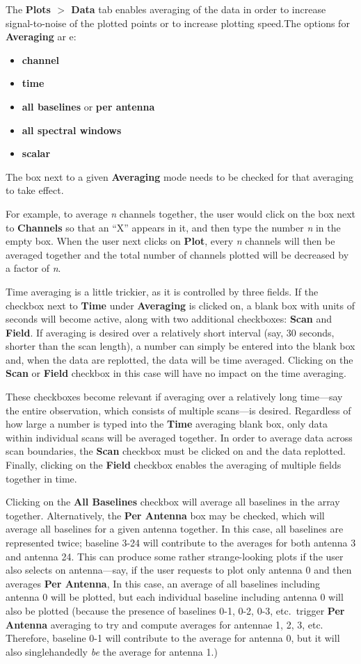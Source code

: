 The {\bf Plots $>$ Data} tab enables averaging of the data in order to increase signal-to-noise of the plotted points or to increase plotting speed.The options for {\bf Averaging} ar e: 
\begin{itemize}
   \item {\bf channel}
   \item {\bf time}
   \item {\bf all baselines} or {\bf per antenna}
   \item {\bf all spectral windows}
   \item {\bf scalar}
\end{itemize}
The box next to a given {\bf Averaging} mode needs to be checked for
that averaging to take effect.

For example, to average {\it n} channels together, the user would
click on the box next to {\bf Channels} so that an ``X'' appears in
it, and then type the number {\it n} in the empty box. When the user
next clicks on {\bf Plot}, every {\it n} channels will then be
averaged together and the total number of channels plotted will be
decreased by a factor of {\it n}.

Time averaging is a little trickier, as it is controlled by three
fields. If the checkbox next to {\bf Time} under {\bf Averaging} is
clicked on, a blank box with units of seconds will become active,
along with two additional checkboxes: {\bf Scan} and {\bf Field}. If
averaging is desired over a relatively short interval (say, 30
seconds, shorter than the scan length), a number can simply be entered
into the blank box and, when the data are replotted, the data will be
time averaged. Clicking on the {\bf Scan} or {\bf Field} checkbox in
this case will have no impact on the time averaging.

These checkboxes become relevant if averaging over a relatively long
time---say the entire observation, which consists of multiple
scans---is desired. Regardless of how large a number is typed into the
{\bf Time} averaging blank box, only data within individual scans will
be averaged together. In order to average data across scan boundaries,
the {\bf Scan} checkbox must be clicked on and the data
replotted. Finally, clicking on the {\bf Field} checkbox enables the
averaging of multiple fields together in time.

Clicking on the {\bf All Baselines} checkbox will average all
baselines in the array together. Alternatively, the {\bf Per Antenna}
box may be checked, which will average all baselines for a given
antenna together. In this case, all baselines are represented twice;
baseline 3-24 will contribute to the averages for both antenna 3 and
antenna 24. This can produce some rather strange-looking plots if the
user also selects on antenna---say, if the user requests to plot only
antenna 0 and then averages {\bf Per Antenna}, In this case, an
average of all baselines including antenna 0 will be plotted, but each
individual baseline including antenna 0 will also be plotted (because
the presence of baselines 0-1, 0-2, 0-3, etc.~trigger {\bf Per
  Antenna} averaging to try and compute averages for antennae 1, 2, 3,
etc. Therefore, baseline 0-1 will contribute to the average for
antenna 0, but it will also singlehandedly {\it be} the average for
antenna 1.)

